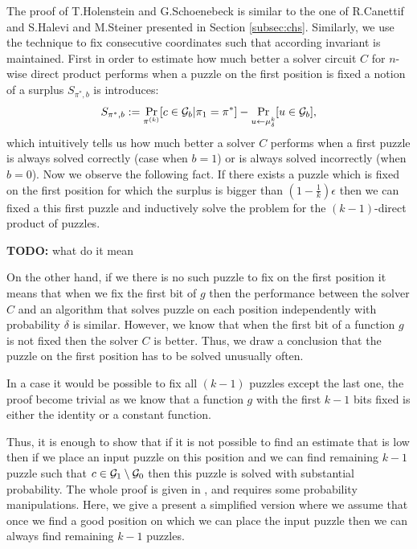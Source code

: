 The proof of T.Holenstein and G.Schoenebeck is similar to the one of R.Canettif and S.Halevi and M.Steiner presented in Section \ref{subsec:chs}.
Similarly, we use the technique to fix consecutive coordinates such that according invariant is maintained.
First in order to estimate how much better a solver circuit $C$ for $n$-wise direct product performs when
a puzzle on the first position is fixed a notion of a surplus $S_{\pi^*, b}$ is introduces:
\begin{align*}
S_{\pi^*, b} := \Pr_{\pi^{(k)}} [ c \in \mathcal{G}_b | \pi_1 = \pi^* ] - \Pr_{u \leftarrow \mu_{\delta}^{k}} [u \in \mathcal{G}_b],
\end{align*}
which intuitively tells us how much better a solver $C$ performs when a first puzzle is always solved correctly (case when $b = 1$)
or is always solved incorrectly (when $b = 0$).
Now we observe the following fact. If there exists a puzzle which is fixed on the first position for which the surplus is bigger than
$(1 - \frac{1}{k})\epsilon$ then we can fixed a this first puzzle and inductively solve the problem for the $(k-1)$-direct product of puzzles.
\begin{todo}
  \textbf{TODO:} what do it mean
\end{todo}
On the other hand, if we there is no such puzzle to fix on the first position it means that when we fix the first bit of $g$ then
the performance between the solver $C$ and an algorithm that solves puzzle on each position independently with probability $\delta$
is similar. However, we know that when the first bit of a function $g$ is not fixed then the solver $C$ is better.
Thus, we draw a conclusion that the puzzle on the first position has to be solved unusually often.

In a case it would be possible to fix all $(k-1)$ puzzles except the last one, the proof become trivial as we know that a function
$g$ with the first $k-1$ bits fixed is either the identity or a constant function.

Thus, it is enough to show that if it is not possible to find an estimate that is low then
if we place an input puzzle on this position and we can find remaining $k-1$ puzzle such that
$c \in \mathcal{G}_1 \setminus \mathcal{G}_0$ then this puzzle is solved with substantial probability.
The whole proof is given in \cite{DBLP:journals/corr/abs-1002-3534}, and requires some probability manipulations.
Here, we give a present a simplified version where we assume that once we find a good position on which we can place the input puzzle then
we can always find remaining $k-1$ puzzles.

